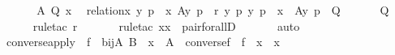 \begin{isabellebody}
%
\isadelimproof
%
\endisadelimproof
%
\isatagproof
{}\isamarkupfalse%
\ {\isacharminus}{\kern0pt}\ \isanewline
\ \ \isamarkupfalse%
\ A\ Q\ x\ \isamarkupfalse%
\ {\isachardoublequoteopen}relation{\isacharparenleft}{\kern0pt}x{\isacharparenright}{\kern0pt}{\isachardoublequoteclose}\ {\isachardoublequoteopen}{\isasymforall}{\isacharless}{\kern0pt}y{\isacharcomma}{\kern0pt}\ p{\isachargreater}{\kern0pt}\ {\isasymin}\ x{\isachardot}{\kern0pt}\ A{\isacharparenleft}{\kern0pt}y{\isacharcomma}{\kern0pt}\ p{\isacharparenright}{\kern0pt}{\isachardoublequoteclose}\ \ r{\isacharcolon}{\kern0pt}\ {\isachardoublequoteopen}{\isacharparenleft}{\kern0pt}{\isacharparenleft}{\kern0pt}{\isasymAnd}y\ p{\isachardot}{\kern0pt}\ {\isacharless}{\kern0pt}y{\isacharcomma}{\kern0pt}\ p{\isachargreater}{\kern0pt}\ {\isasymin}\ x\ {\isasymLongrightarrow}\ A{\isacharparenleft}{\kern0pt}y{\isacharcomma}{\kern0pt}\ p{\isacharparenright}{\kern0pt}{\isacharparenright}{\kern0pt}\ {\isasymLongrightarrow}\ Q{\isacharparenright}{\kern0pt}{\isachardoublequoteclose}\ \isanewline
\ \ \isamarkupfalse%
\ \isamarkupfalse%
\ {\isachardoublequoteopen}Q{\isachardoublequoteclose}\ \isanewline
\ \ \ \ \isamarkupfalse%
\ {\isacharparenleft}{\kern0pt}rule{\isacharunderscore}{\kern0pt}tac\ r{\isacharparenright}{\kern0pt}\ \isanewline
\ \ \ \ \isamarkupfalse%
\ {\isacharparenleft}{\kern0pt}rule{\isacharunderscore}{\kern0pt}tac\ x{\isacharequal}{\kern0pt}x\ \ pair{\isacharunderscore}{\kern0pt}forallD{\isacharparenright}{\kern0pt}\ \isanewline
\ \ \ \ \isamarkupfalse%
\ auto\ \isanewline
{}\isamarkupfalse%
%
\endisatagproof
{\isafoldproof}%
%
\isadelimproof
\isanewline
%
\endisadelimproof
\isanewline
{}\isamarkupfalse%
\ converse{\isacharunderscore}{\kern0pt}apply\ {\isacharcolon}{\kern0pt}\ {\isachardoublequoteopen}f\ {\isasymin}\ bij{\isacharparenleft}{\kern0pt}A{\isacharcomma}{\kern0pt}\ B{\isacharparenright}{\kern0pt}\ {\isasymLongrightarrow}\ x\ {\isasymin}\ A\ {\isasymLongrightarrow}\ converse{\isacharparenleft}{\kern0pt}f{\isacharparenright}{\kern0pt}\ {\isacharbackquote}{\kern0pt}\ {\isacharparenleft}{\kern0pt}f\ {\isacharbackquote}{\kern0pt}\ x{\isacharparenright}{\kern0pt}\ {\isacharequal}{\kern0pt}\ x{\isachardoublequoteclose}\ \isanewline
%
\isadelimproof
%
\endisadelimproof
%
\isatagproof
{}\isamarkupfalse%
\ {\isacharminus}{\kern0pt}\ \isanewline
\ \ \isamarkupfalse%

\end{isabellebody}
